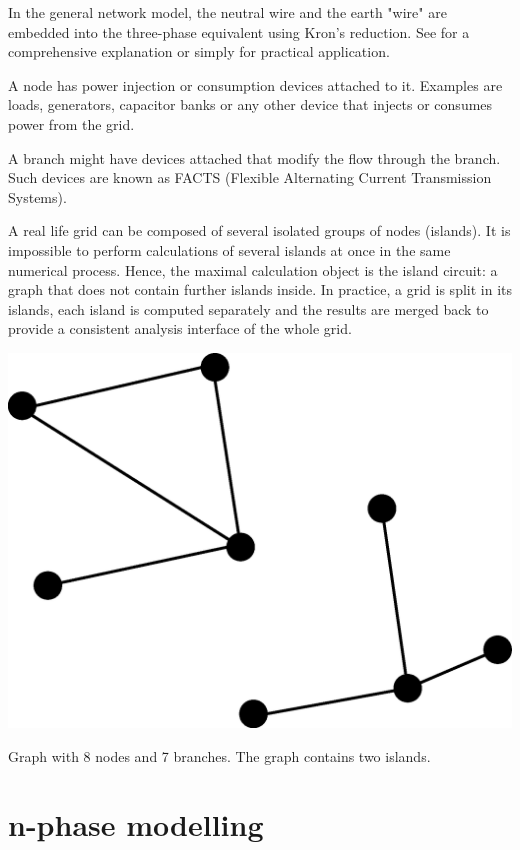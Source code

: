 \documentclass[nols,a4paper,twoside,notoc,fleqn]{tufte-book}
\begin{document}
In the general network model, the neutral wire and the earth "wire" are embedded into the three-phase equivalent using Kron's reduction. See \cite{dorfler2013kron} for a comprehensive explanation or simply \cite{kersting2012distribution} for practical application.

A node has power injection or consumption devices attached to it. Examples are loads, generators, capacitor banks or any other device that injects or consumes power from the grid.

A branch might have devices attached that modify the flow through the branch. Such devices are known as FACTS (Flexible Alternating Current Transmission Systems). 

A real life grid can be composed of several isolated groups of nodes (islands). It is impossible to perform calculations of several islands at once in the same numerical process. Hence, the maximal calculation object is the island circuit: a graph that does not contain further islands inside. In practice, a grid is split in its islands, each island is computed separately and the results are merged back to provide a consistent analysis interface of the whole grid.
\begin{marginfigure}
  \includegraphics[width=\linewidth]{img/simple_two_island_graph.eps}
  \caption{Graph with 8 nodes and 7 branches. The graph contains two islands.}
  \label{fig:simple_two_island_graph}
\end{marginfigure}



\section{n-phase modelling}
\end{document}
